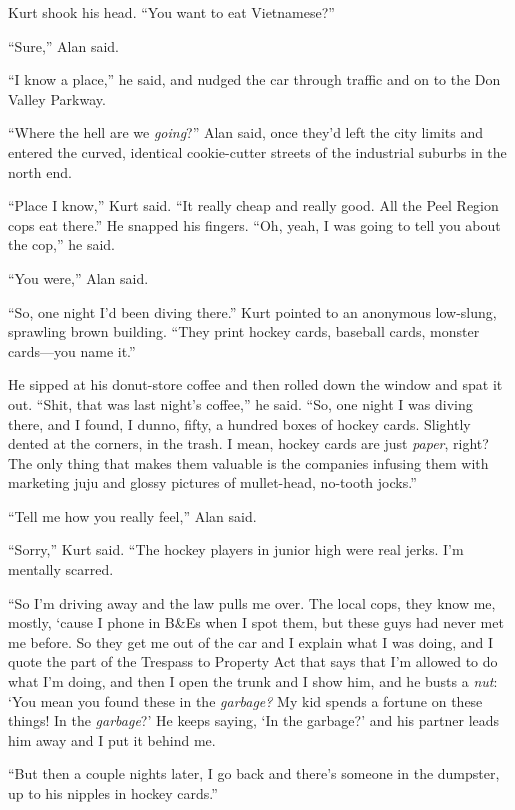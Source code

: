 \documentclass{article}
\begin{document}
Kurt shook his head.  ``You want to eat Vietnamese?''

``Sure,'' Alan said.

``I know a place,'' he said, and nudged the car through traffic and on
to the Don Valley Parkway.

``Where the hell are we \textit{going}?'' Alan said, once they'd left
the city limits and entered the curved, identical cookie-cutter
streets of the industrial suburbs in the north end.

``Place I know,'' Kurt said.  ``It really cheap and really good.  All
the Peel Region cops eat there.'' He snapped his fingers.  ``Oh, yeah,
I was going to tell you about the cop,'' he said.

``You were,'' Alan said.

``So, one night I'd been diving there.'' Kurt pointed to an anonymous
low-slung, sprawling brown building.  ``They print hockey cards,
baseball cards, monster cards---you name it.''

He sipped at his donut-store coffee and then rolled down the window
and spat it out.  ``Shit, that was last night's coffee,'' he said. 
``So, one night I was diving there, and I found, I dunno, fifty, a
hundred boxes of hockey cards.  Slightly dented at the corners, in the
trash.  I mean, hockey cards are just \textit{paper}, right?  The only
thing that makes them valuable is the companies infusing them with
marketing juju and glossy pictures of mullet-head, no-tooth jocks.''

``Tell me how you really feel,'' Alan said.

``Sorry,'' Kurt said.  ``The hockey players in junior high were real
jerks.  I'm mentally scarred.

``So I'm driving away and the law pulls me over.  The local cops, they
know me, mostly, `cause I phone in B\&Es when I spot them, but
these guys had never met me before.  So they get me out of the car and
I explain what I was doing, and I quote the part of the Trespass to
Property Act that says that I'm allowed to do what I'm doing, and then
I open the trunk and I show him, and he busts a \textit{nut}:  `You
mean you found these in the \textit{garbage?} My kid spends a fortune
on these things!  In the \textit{garbage}?' He keeps saying, `In the
garbage?' and his partner leads him away and I put it behind me.

``But then a couple nights later, I go back and there's someone in the
dumpster, up to his nipples in hockey cards.''
\end{document}
